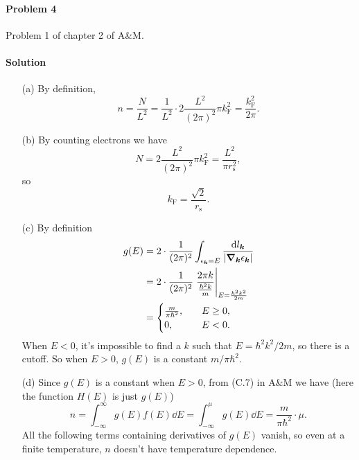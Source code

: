 \documentclass[hyperref, a4paper]{article}
\begin{document}
\paragraph{Problem 4} Problem 1 of chapter 2 of A\&M.

\paragraph{Solution} \begin{itemize}
\item[(a)] By definition, 
\begin{equation}
    n = \frac{N}{L^2} = \frac{1}{L^2} \cdot 2 \frac{L^2}{(2\pi)^2} \pi k_{\text{F}}^2
    = \frac{k_{\text{F}}^2}{2\pi}.
\end{equation}
\item[(b)] By counting electrons we have 
\[
    N = 2 \frac{L^2}{(2\pi)^2} \pi k_{\text{F}}^2 = \frac{L^2}{\pi r_{\text{s}}^2},
\]
so 
\begin{equation}
    k_{\text{F}} = \frac{\sqrt{2}}{r_{\text{s}}}.
\end{equation}

\item[(c)] By definition
\[
    \begin{aligned}
        g(E) &= 2 \cdot \frac{1}{(2\pi)^2} \int_{\epsilon_{\vb*{k}} = E} 
        \frac{\dd{l_{\vb*{k}}}}{\abs{\grad_{\vb*{k}} \epsilon_{\vb*{k}}}} \\
        &= 2 \cdot \frac{1}{(2\pi)^2} \eval{\frac{2\pi k}{\frac{\hbar^2 k}{m}}}_{ E = \frac{\hbar^2 k^2}{2m} } \\
        &= \begin{cases}
            \frac{m}{\pi \hbar^2}, & \quad E \geq 0, \\
            0                    , & \quad E < 0.
        \end{cases}
    \end{aligned}
\]
When $E < 0$, it's impossible to find a $k$ such that $E = \hbar^2 k^2 / 2m$,
so there is a cutoff.
So when $E > 0$, $g(E)$ is a constant $m / \pi \hbar^2$.

\item[(d)] Since $g(E)$ is a constant when $E > 0$,
from (C.7) in A\&M we have (here the function $H(E)$ is just $g(E)$)
\begin{equation}
    n = \int_{-\infty}^\infty g(E) f(E) \dd{E}  = \int_{-\infty}^\mu g(E) \dd{E} = 
    \frac{m}{\pi \hbar^2} \cdot \mu.
\end{equation}
All the following terms containing derivatives of $g(E)$ vanish, 
so even at a finite temperature,
$n$ doesn't have temperature dependence.


\end{itemize}
\end{document}
